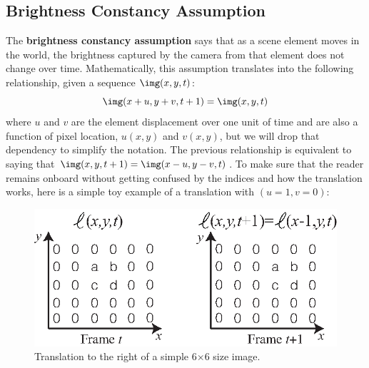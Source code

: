 




\subsection{Brightness Constancy Assumption}

The {\bf brightness constancy assumption}  says that as a scene element moves in the world, the brightness captured by the camera from that element does not change over time. Mathematically, this assumption translates into the following relationship, given a sequence $\img (x,y,t)$:
\begin{equation}
\img (x +u, y+v, t + 1)  = \img (x,y,t)
\label{eq:constancy_brightness_assumption}
\end{equation}
where $u$ and $v$ are the element displacement over one unit of time and are also a function of pixel location, $u(x,y)$ and $v(x,y)$, but we will drop that dependency to simplify the notation. The previous relationship is equivalent to saying that $\img (x, y, t + 1) = \img (x-u,y-v,t)$. To make sure that the reader remains onboard without getting confused by the indices and how the translation works, here is a simple toy example of a translation with $(u=1, v=0)$:

\begin{figure}[h!]
\centerline{
\includegraphics[width=.5\linewidth]{figures/optical_flow/toy_motion_figure.eps}}
\caption{Translation to the right of a simple 6$\times$6 size image.}
\end{figure}
\vspace{-0.2in}


